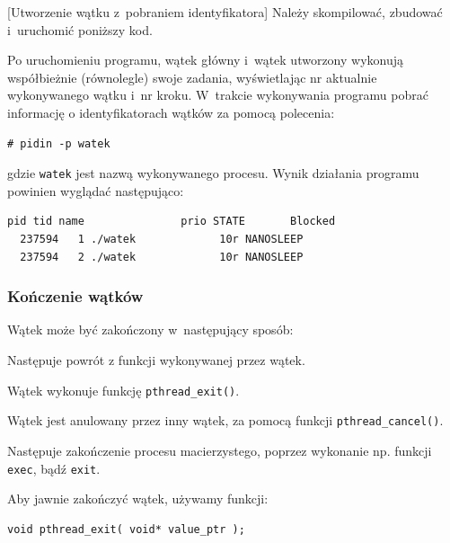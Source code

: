 \begin{example}{[Utworzenie wątku z~pobraniem identyfikatora]}
Należy skompilować, zbudować i~uruchomić poniższy kod.



Po uruchomieniu programu, wątek główny i~wątek utworzony wykonują współbieżnie (równolegle) swoje zadania, wyświetlając nr aktualnie wykonywanego wątku i~nr kroku. W~trakcie wykonywania programu pobrać informację o identyfikatorach wątków za pomocą polecenia:

\begin{lstlisting}[style=MyCStyle]
# pidin -p watek
\end{lstlisting}

gdzie \lstinline[style=MyCStyle]{watek} jest nazwą wykonywanego procesu. Wynik działania programu powinien wyglądać następująco:

\begin{lstlisting}[style=MyCStyle]
     pid tid name               prio STATE       Blocked
  237594   1 ./watek             10r NANOSLEEP
  237594   2 ./watek             10r NANOSLEEP
\end{lstlisting}

\end{example}


\subsubsection{Kończenie wątków}

Wątek może być zakończony w~następujący sposób:

\begin{myitemize}
\item Następuje powrót z funkcji wykonywanej przez wątek.
\item Wątek wykonuje funkcję \lstinline[style=MyCStyle]{pthread_exit()}.
\item Wątek jest anulowany przez inny wątek, za pomocą funkcji \lstinline[style=MyCStyle]{pthread_cancel()}.
\item Następuje zakończenie procesu macierzystego, poprzez wykonanie np. funkcji \lstinline[style=MyCStyle]{exec}, bądź \lstinline[style=MyCStyle]{exit}.
\end{myitemize}

Aby jawnie zakończyć  wątek, używamy funkcji:

\begin{lstlisting}[style=MyCStyle]
void pthread_exit( void* value_ptr );
\end{lstlisting}

